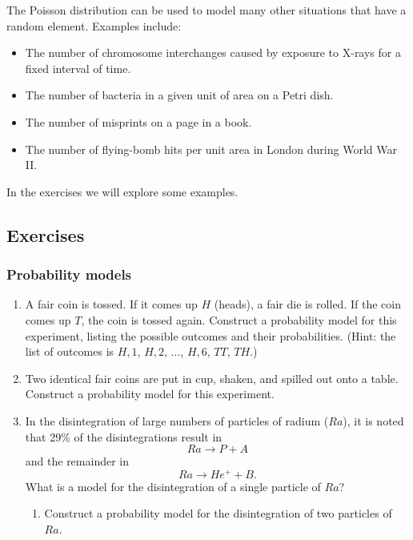         The Poisson distribution can be used to model many other
situations that have a random element.  Examples include:
\begin{itemize}
\item The number of chromosome interchanges caused by exposure to
X-rays for a fixed interval of time.
\item The number of bacteria in a given unit of area on a Petri dish.
\item The number of misprints on a page in a book.
\item The number of flying-bomb hits per unit area in London during
World War II.
\end{itemize}
In the exercises we will explore some examples.



\subsection{Exercises}
\label{subsec:exercises}

\subsubsection{Probability models}
\label{subsubsec:probability-models}




\begin{enumerate}
\item A fair coin is tossed.  If it comes up $H$ (heads), a fair die is
rolled.  If the coin comes up $T$, the coin is tossed again.
Construct a probability model for this experiment, listing the
possible outcomes and their probabilities.  (Hint: the list of
outcomes is $H,1$, $H, 2$, $\ldots$, $H,6$, $TT$, $TH$.)



\item Two identical fair coins are put in cup, shaken, and spilled out
onto a table.  Construct a probability model for this experiment.



\item In the disintegration of large numbers of particles of radium
($Ra$), it is noted that 29\% of the disintegrations result in
\[
Ra \longrightarrow P + A
\] 
and the remainder in 
\[
Ra \longrightarrow He^+ + B.
\]
What is a model for the disintegration of a single particle of $Ra$?

  \begin{enumerate}
  \item Construct a probability model for the disintegration of two
particles of~$Ra$.


\end{enumerate}
\end{enumerate}
